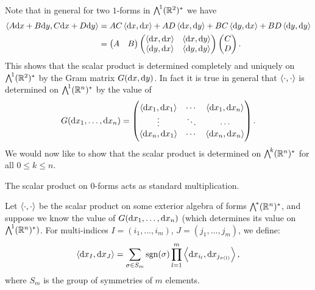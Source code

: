 \documentclass[11pt,a4paper]{article}
\begin{document}
\begin{remark}
  Note that in general for two $1$-forms in $\bigwedge^{\!1}(\mathbb{R}^2)^*$
  we have
  \begin{align*}
    \ip{A \dx + B \dy}{C \dx + D \dy} &=
    AC \ip{\dx}{\dx} + AD \ip{\dx}{\dy} +
    BC \ip{\dy}{\dx} + BD \ip{\dy}{\dy} \\ &=
    \begin{pmatrix}
      A & B
    \end{pmatrix}
    \begin{pmatrix}
      \ip{\dx}{\dx} & \ip{\dx}{\dy} \\
      \ip{\dy}{\dx} & \ip{\dy}{\dy}
    \end{pmatrix}
    \begin{pmatrix}
      C \\ D
    \end{pmatrix}.
  \end{align*}
  This shows that the scalar product
  is determined completely and uniquely on $\bigwedge^{\!1}(\mathbb{R}^2)^*$
  by the Gram matrix $G(\dx,\dy)$.
  In fact it is true in general that $\left\langle \cdot, \cdot \right\rangle$
  is determined on $\bigwedge^{\!1}(\mathbb{R}^n)^*$ by the value of
  \[
    G(\dx_1,\dots,\dx_n) =
    \begin{pmatrix}
      \ip{\dx_1}{\dx_1} & \cdots & \ip{\dx_1}{\dx_n} \\
      \vdots & \ddots & \cdots \\
      \ip{\dx_n}{\dx_1} & \cdots & \ip{\dx_n}{\dx_n}
    \end{pmatrix}.
  \]
  We would now like to show that the scalar product is determined
  on $\bigwedge^{\!k}(\mathbb{R}^n)^*$ for all $0 \le k \le n$.
\end{remark}

\begin{remark}
  The scalar product on $0$-forms acts as standard multiplication.
\end{remark}

\begin{definition}
  Let $\left\langle \cdot, \cdot \right\rangle$ be the scalar product on some exterior algebra
  of forms $\bigwedge^{\!*}(\mathbb{R}^n)^*$,
  and suppose we know the value of $G(\dx_1,\dots,\dx_n)$
  (which determines its value on $\bigwedge^{\!1}(\mathbb{R}^n)^*)$.
  For multi-indices $I = (i_1,\dots,i_m)$, $J = (j_1,\dots,j_m)$, we define:
  \[
    \ip{\dx_I}{\dx_J} =
    \sum_{\sigma \in S_m} \sgn(\sigma) \prod_{l=1}^{m} \ip{\dx_{i_l}}{\dx_{j_{\sigma(l)}}},
  \]
  where $S_m$ is the group of symmetries of $m$ elements.
\end{definition}
\end{document}
